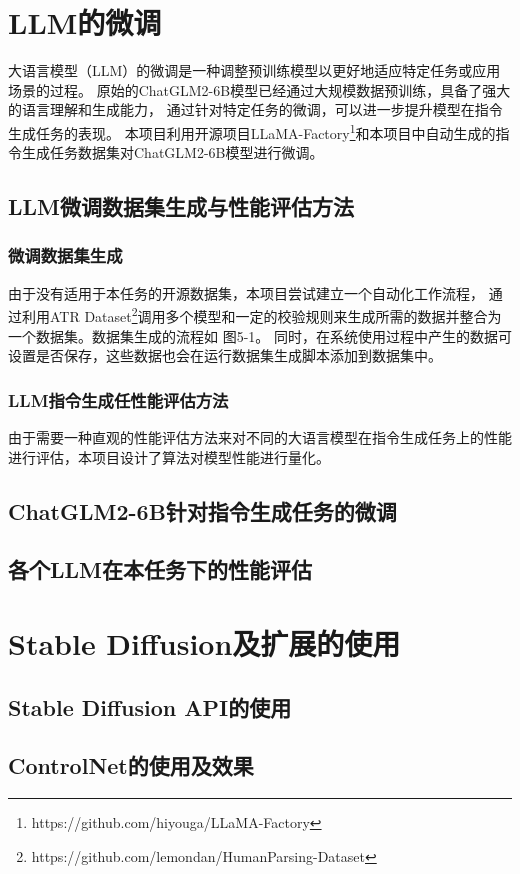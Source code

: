 \documentclass[a4paper,AutoFakeBold,oneside,12pt]{book}
\begin{document}
\chapter{LLM的微调}
大语言模型（LLM）的微调是一种调整预训练模型以更好地适应特定任务或应用场景的过程。
原始的ChatGLM2-6B模型已经通过大规模数据预训练，具备了强大的语言理解和生成能力，
通过针对特定任务的微调，可以进一步提升模型在指令生成任务的表现。
本项目利用开源项目LLaMA-Factory\footnote{https://github.com/hiyouga/LLaMA-Factory}和本项目中自动生成的指令生成任务数据集对ChatGLM2-6B模型进行微调。
\section{LLM微调数据集生成与性能评估方法}
\subsection{微调数据集生成}
由于没有适用于本任务的开源数据集，本项目尝试建立一个自动化工作流程，
通过利用ATR Dataset\footnote{https://github.com/lemondan/HumanParsing-Dataset}调用多个模型和一定的校验规则来生成所需的数据并整合为一个数据集。数据集生成的流程如 图5-1。
同时，在系统使用过程中产生的数据可设置是否保存，这些数据也会在运行数据集生成脚本添加到数据集中。
\subsection{LLM指令生成任性能评估方法}
由于需要一种直观的性能评估方法来对不同的大语言模型在指令生成任务上的性能进行评估，本项目设计了算法对模型性能进行量化。

\section{ChatGLM2-6B针对指令生成任务的微调}
\section{各个LLM在本任务下的性能评估}

\chapter{Stable Diffusion及扩展的使用}
\section{Stable Diffusion API的使用}
\section{ControlNet的使用及效果}
\end{document}
